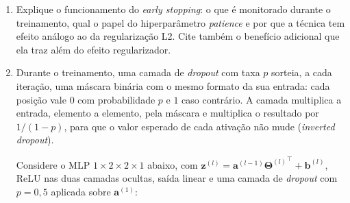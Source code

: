 \documentclass{dlproblemset}
\begin{document}
\begin{enumerate}[1)]
    \item Explique o funcionamento do \textit{early stopping}: o que é monitorado durante o treinamento, qual o papel do hiperparâmetro \textit{patience} e por que a técnica tem efeito análogo ao da regularização L2. Cite também o benefício adicional que ela traz além do efeito regularizador.


    \item Durante o treinamento, uma camada de \textit{dropout} com taxa $p$ sorteia, a cada iteração, uma máscara binária com o mesmo formato da sua entrada: cada posição vale $0$ com probabilidade $p$ e $1$ caso contrário. A camada multiplica a entrada, elemento a elemento, pela máscara e multiplica o resultado por $1/(1-p)$, para que o valor esperado de cada ativação não mude (\textit{inverted dropout}).

    Considere o MLP $1 \times 2 \times 2 \times 1$ abaixo, com $\mathbf{z}^{(l)} = \mathbf{a}^{(l-1)}{\mathbf{\Theta}^{(l)}}^{\top} + \mathbf{b}^{(l)}$, ReLU nas duas camadas ocultas, saída linear e uma camada de \textit{dropout} com $p = 0{,}5$ aplicada sobre $\mathbf{a}^{(1)}$:

    \begin{center}
    \end{center}


\end{enumerate}
\end{document}

